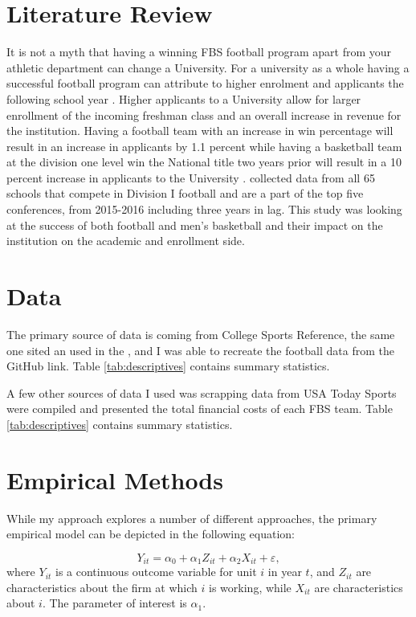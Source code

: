 \documentclass[12pt,english]{article}
\begin{document}
\section{Literature Review}\label{sec:litreview}
It is not a myth that having a winning FBS football program apart from your athletic department can change a University. For a university as a whole having a successful football program can attribute to higher enrolment and applicants the following school year \citet{baumer2019impact}. Higher applicants to a University allow for larger enrollment of the incoming freshman class and an overall increase in revenue for the institution. Having a football team with an increase in win percentage will result in an increase in applicants by 1.1 percent while having a basketball team at the division one level win the National title two years prior will result in a 10 percent increase in applicants to the University \citet{baumer2019impact}. \citet{baumer2019impact} collected data from all 65 schools that compete in Division I football and are a part of the top five conferences, from 2015-2016 including three years in lag. This study was looking at the success of both football and men’s basketball and their impact on the institution on the academic and enrollment side.

\section{Data}\label{sec:data}
The primary source of data is coming from College Sports Reference, the same one sited an used in the \citet{baumer2019impact}, and I was able to recreate the football data from the GitHub link. Table \ref{tab:descriptives} contains summary statistics.

A few other sources of data I used was scrapping data from USA Today Sports were \citet{berkowitz_varney} compiled and presented the total financial costs of each FBS team. Table \ref{tab:descriptives} contains summary statistics.



\section{Empirical Methods}\label{sec:methods}
While my approach explores a number of different approaches, the primary empirical model can be depicted in the following equation:

\begin{equation}
\label{eq:1}
Y_{it}=\alpha_{0} + \alpha_{1}Z_{it} + \alpha_{2} X_{it} + \varepsilon,
\end{equation}
where $Y_{it}$ is a continuous outcome variable for unit $i$ in year $t$, and $Z_{it}$ are characteristics about the firm at which $i$ is working, while $X_{it}$ are characteristics about $i$. The parameter of interest is $\alpha_{1}$.
\end{document}
